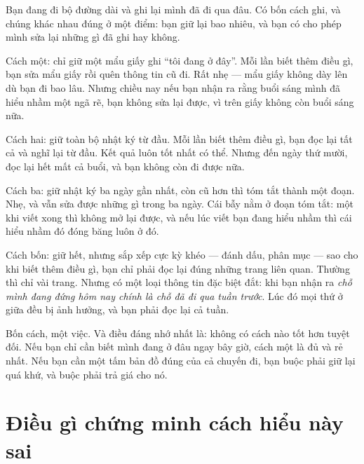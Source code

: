 \documentclass[../../vslam.tex]{subfiles}
\begin{document}
\begin{dongian}
Bạn đang đi bộ đường dài và ghi lại mình đã đi qua đâu. Có bốn cách ghi, và chúng khác nhau đúng ở một điểm: bạn giữ lại bao nhiêu, và bạn có cho phép mình sửa lại những gì đã ghi hay không.

Cách một: chỉ giữ một mẩu giấy ghi ``tôi đang ở đây''. Mỗi lần biết thêm điều gì, bạn sửa mẩu giấy rồi quên thông tin cũ đi. Rất nhẹ --- mẩu giấy không dày lên dù bạn đi bao lâu. Nhưng chiều nay nếu bạn nhận ra rằng buổi sáng mình đã hiểu nhầm một ngã rẽ, bạn không sửa lại được, vì trên giấy không còn buổi sáng nữa.

Cách hai: giữ toàn bộ nhật ký từ đầu. Mỗi lần biết thêm điều gì, bạn đọc lại tất cả và nghĩ lại từ đầu. Kết quả luôn tốt nhất có thể. Nhưng đến ngày thứ mười, đọc lại hết mất cả buổi, và bạn không còn đi được nữa.

Cách ba: giữ nhật ký ba ngày gần nhất, còn cũ hơn thì tóm tắt thành một đoạn. Nhẹ, và vẫn sửa được những gì trong ba ngày. Cái bẫy nằm ở đoạn tóm tắt: một khi viết xong thì không mở lại được, và nếu lúc viết bạn đang hiểu nhầm thì cái hiểu nhầm đó đóng băng luôn ở đó.

Cách bốn: giữ hết, nhưng sắp xếp cực kỳ khéo --- đánh dấu, phân mục --- sao cho khi biết thêm điều gì, bạn chỉ phải đọc lại đúng những trang liên quan. Thường thì chỉ vài trang. Nhưng có một loại thông tin đặc biệt đắt: khi bạn nhận ra \emph{chỗ mình đang đứng hôm nay chính là chỗ đã đi qua tuần trước}. Lúc đó mọi thứ ở giữa đều bị ảnh hưởng, và bạn phải đọc lại cả tuần.

Bốn cách, một việc. Và điều đáng nhớ nhất là: không có cách nào tốt hơn tuyệt đối. Nếu bạn chỉ cần biết mình đang ở đâu ngay bây giờ, cách một là đủ và rẻ nhất. Nếu bạn cần một tấm bản đồ đúng của cả chuyến đi, bạn buộc phải giữ lại quá khứ, và buộc phải trả giá cho nó.

\end{dongian}

\section{Điều gì chứng minh cách hiểu này sai}
\end{document}
